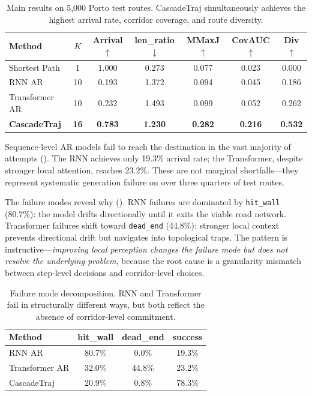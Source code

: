 \begin{table}[t]
  \caption{Main results on 5{,}000 Porto test routes. CascadeTraj simultaneously achieves the highest arrival rate, corridor coverage, and route diversity.}
  \label{tab:main}
  \vskip 0.1in
  \centering
  \small
  \begin{tabular}{lcccccc}
    \toprule
    Method & $K$ & Arrival$\uparrow$ & len\_ratio$\downarrow$ & MMaxJ$\uparrow$ & CovAUC$\uparrow$ & Div$\uparrow$ \\
    \midrule
    Shortest Path  & 1  & 1.000 & 0.273 & 0.077 & 0.023 & 0.000 \\
    RNN AR         & 10 & 0.193 & 1.372 & 0.094 & 0.045 & 0.186 \\
    Transformer AR & 10 & 0.232 & 1.493 & 0.099 & 0.052 & 0.262 \\
    \textbf{CascadeTraj}   & \textbf{16} & \textbf{0.783} & \textbf{1.230} & \textbf{0.282} & \textbf{0.216} & \textbf{0.532} \\
    \bottomrule
  \end{tabular}
  \vskip -0.1in
\end{table}

Sequence-level AR models fail to reach the destination in the vast majority of attempts ().
The RNN achieves only 19.3\% arrival rate; the Transformer, despite stronger local attention, reaches 23.2\%.
These are not marginal shortfalls---they represent systematic generation failure on over three quarters of test routes.

The failure modes reveal why ().
RNN failures are dominated by \texttt{hit\_wall} (80.7\%): the model drifts directionally until it exits the viable road network.
Transformer failures shift toward \texttt{dead\_end} (44.8\%): stronger local context prevents directional drift but navigates into topological traps.
The pattern is instructive---\emph{improving local perception changes the failure mode but does not resolve the underlying problem}, because the root cause is a granularity mismatch between step-level decisions and corridor-level choices.

\begin{table}[t]
  \caption{Failure mode decomposition. RNN and Transformer fail in structurally different ways, but both reflect the absence of corridor-level commitment.}
  \label{tab:failure}
  \vskip 0.1in
  \centering
  \small
  \begin{tabular}{lccc}
    \toprule
    Method & hit\_wall & dead\_end & success \\
    \midrule
    RNN AR         & 80.7\% & 0.0\%  & 19.3\% \\
    Transformer AR & 32.0\% & 44.8\% & 23.2\% \\
    CascadeTraj    & 20.9\% & 0.8\%  & 78.3\% \\
    \bottomrule
  \end{tabular}
  \vskip -0.1in
\end{table}

